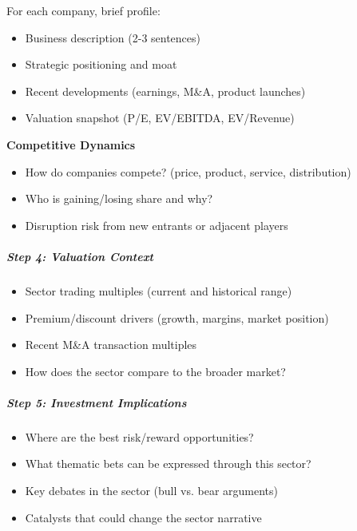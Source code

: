 \documentclass[11pt]{article}
\begin{document}
For each company, brief profile:

\begin{itemize}[leftmargin=*,itemsep=2pt,topsep=2pt]
\item {} Business description (2-3 sentences)
\item {} Strategic positioning and moat
\item {} Recent developments (earnings, M\&A, product launches)
\item {} Valuation snapshot (P/E, EV/EBITDA, EV/Revenue)
\end{itemize}

\textbf{Competitive Dynamics}

\begin{itemize}[leftmargin=*,itemsep=2pt,topsep=2pt]
\item {} How do companies compete? (price, product, service, distribution)
\item {} Who is gaining/losing share and why?
\item {} Disruption risk from new entrants or adjacent players
\end{itemize}

\subparagraph{Step 4: Valuation Context}\mbox{}\par

\begin{itemize}[leftmargin=*,itemsep=2pt,topsep=2pt]
\item {} Sector trading multiples (current and historical range)
\item {} Premium/discount drivers (growth, margins, market position)
\item {} Recent M\&A transaction multiples
\item {} How does the sector compare to the broader market?
\end{itemize}

\subparagraph{Step 5: Investment Implications}\mbox{}\par

\begin{itemize}[leftmargin=*,itemsep=2pt,topsep=2pt]
\item {} Where are the best risk/reward opportunities?
\item {} What thematic bets can be expressed through this sector?
\item {} Key debates in the sector (bull vs. bear arguments)
\item {} Catalysts that could change the sector narrative
\end{itemize}
\end{document}
